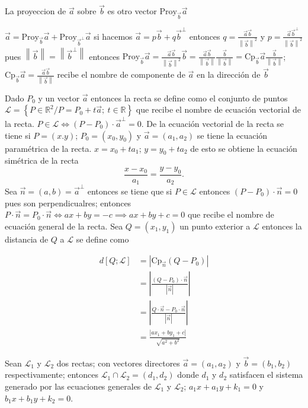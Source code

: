\documentclass[12pt,]{report}
\theoremstyle{slplain}
\begin{document}
La proyeccion de \(\vec{a}\) sobre \(\vec{b}\) es otro vector \(\text{Proy}_{\vec{b}}\vec{a}\)

\(\vec{a}=\text{Proy}_{\vec{b}}\vec{a}+\text{Proy}_{\vec{b}^\perp}\vec{a}\) si hacemos \(\vec{a}=p\vec{b}+q\vec{b}^\perp\) entonces \(q=\frac{\vec{a}\vec{b}}{\left\|\vec{b}\right\|^2}\) y \(p=\frac{\vec{a}\vec{b}^\perp}{\left\|\vec{b}\right\|^2}\) pues \(\left\|\vec{b}\right\|=\left\|\vec{b}^\perp\right\|\) entonces \(\text{Proy}_{\vec{b}}\vec{a}=\frac{\vec{a}\vec{b}}{\left\|\vec{b}\right\|^2}\vec{b}=\frac{\vec{a}\vec{b}}{\left\|\vec{b}\right\|}\frac{\vec{b}}{\left\|\vec{b}\right\|}=\text{Cp}_{\vec{b}}\vec{a}\frac{\vec{b}}{\left\|\vec{b}\right\|}\); \(\text{Cp}_{\vec{b}}\vec{a}=\frac{\vec{a}\vec{b}}{\left\|\vec{b}\right\|}\) recibe el nombre de componente de \(\vec{a}\) en la dirección de \(\vec{b}\)

Dado \(P_0\) y un vector \(\vec{a}\) entonces la recta se define como el conjunto de puntos \(\mathcal{L}=\left\{P\in\mathbb{R}^2/P=P_0+t\vec{a};\: t\in \mathbb{R}\right\}\) que recibe el nombre de ecuación vectorial de la recta. \(P\in\mathcal{L}\iff (P-P_0)\cdot\vec{a}^\perp=0\). De la ecuación vectorial de la recta se tiene si \(P=(x.y)\); \(P_0=(x_0,y_0)\) y \(\vec{a}=(a_1,a_2)\) se tiene la ecuación paramétrica de la recta. \(x=x_0+ta_1\); \(y=y_0+ta_2\) de esto se obtiene la ecuación simétrica de la recta \[\frac{x-x_0}{a_1}=\frac{y-y_0}{a_2}.\] Sea \(\vec{n}=(a,b)=\vec{a}^\perp\) entonces se tiene que si \(P\in \mathcal{L}\) entonces \((P-P_0)\cdot \vec{n}=0\) pues son perpendicualres; entonces \(P\cdot \vec{n}=P_0\cdot \vec{n}\iff ax+by=-c\implies ax+by+c=0\) que recibe el nombre de ecuación general de la recta. Sea \(Q=(x_1,y_1)\) un punto exterior a \(\mathcal{L}\) entonces la distancia de \(Q\) a \(\mathcal{L}\) se define como

\begin{align*}d[Q;\mathcal{L}] & =\left|\text{Cp}_{\vec{n}}(Q-P_0)\right| \\
& =\left|\frac{(Q-P_0)\cdot\vec{n}}{\left|\vec{n}\right|}\right| \\
& =\left|\frac{Q\cdot\vec{n}-P_0\cdot\vec{n}}{\left|\vec{n}\right|}\right| \\
& =\frac{\left|ax_1+by_1+c\right|}{\sqrt{a^2+b^2}}
\end{align*}

Sean \(\mathcal{L}_1\) y \(\mathcal{L}_2\) dos rectas; con vectores directores \(\vec{a}=(a_1,a_2)\) y \(\vec{b}=(b_1,b_2)\) respectivamente; entonces \(\mathcal{L}_1\cap\mathcal{L}_2=(d_1,d_2)\) donde \(d_1\) y \(d_2\) satisfacen el sistema generado por las ecuaciones generales de \(\mathcal{L}_1\) y \(\mathcal{L}_2\); \(a_1x+a_1y+k_1=0\) y \(b_1x+b_1y+k_2=0\).
\end{document}
